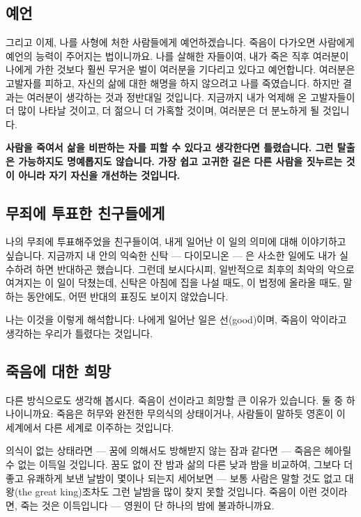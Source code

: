 \documentclass[11pt, a4paper]{article}
\begin{document}
\bigskip


\subsection{예언}


그리고 이제, 나를 사형에 처한 사람들에게 예언하겠습니다. 죽음이 다가오면 사람에게 예언의 능력이 주어지는 법이니까요. 나를 살해한 자들이여, 내가 죽은 직후 여러분이 나에게 가한 것보다 훨씬 무거운 벌이 여러분을 기다리고 있다고 예언합니다. 여러분은 고발자를 피하고, 자신의 삶에 대한 해명을 하지 않으려고 나를 죽였습니다. 하지만 결과는 여러분이 생각하는 것과 정반대일 것입니다. 지금까지 내가 억제해 온 고발자들이 더 많이 나타날 것이고, 더 젊으니 더 가혹할 것이며, 여러분은 더 분노하게 될 것입니다.


\textbf{사람을 죽여서 삶을 비판하는 자를 피할 수 있다고 생각한다면 틀렸습니다. 그런 탈출은 가능하지도 명예롭지도 않습니다. 가장 쉽고 고귀한 길은 다른 사람을 짓누르는 것이 아니라 자기 자신을 개선하는 것입니다.}


\bigskip


\subsection{무죄에 투표한 친구들에게}


나의 무죄에 투표해주었을 친구들이여, 내게 일어난 이 일의 의미에 대해 이야기하고 싶습니다. 지금까지 내 안의 익숙한 신탁 — 다이모니온 — 은 사소한 일에도 내가 실수하려 하면 반대하곤 했습니다. 그런데 보시다시피, 일반적으로 최후의 최악의 악으로 여겨지는 이 일이 닥쳤는데, 신탁은 아침에 집을 나설 때도, 이 법정에 올라올 때도, 말하는 동안에도, 어떤 반대의 표징도 보이지 않았습니다.


나는 이것을 이렇게 해석합니다: 나에게 일어난 일은 선(good)이며, 죽음이 악이라고 생각하는 우리가 틀렸다는 것입니다.


\bigskip


\subsection{죽음에 대한 희망}


다른 방식으로도 생각해 봅시다. 죽음이 선이라고 희망할 큰 이유가 있습니다. 둘 중 하나이니까요: 죽음은 허무와 완전한 무의식의 상태이거나, 사람들이 말하듯 영혼이 이 세계에서 다른 세계로 이주하는 것입니다.


의식이 없는 상태라면 — 꿈에 의해서도 방해받지 않는 잠과 같다면 — 죽음은 헤아릴 수 없는 이득일 것입니다. 꿈도 없이 잔 밤과 삶의 다른 낮과 밤을 비교하여, 그보다 더 좋고 유쾌하게 보낸 날밤이 몇이나 되는지 세어보면 — 보통 사람은 말할 것도 없고 대왕(the great king)조차도 그런 날밤을 많이 찾지 못할 것입니다. 죽음이 이런 것이라면, 죽는 것은 이득입니다 — 영원이 단 하나의 밤에 불과하니까요.
\end{document}
